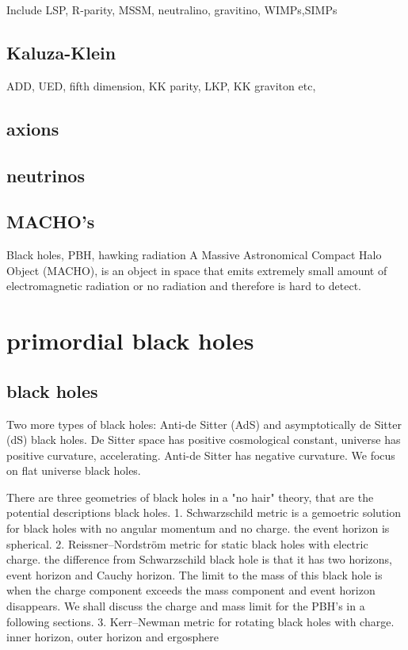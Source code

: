 \documentclass{article}
\begin{document}
Include LSP, R-parity, MSSM, neutralino, gravitino, WIMPs,SIMPs 

\subsection{Kaluza-Klein}
ADD, UED, fifth dimension, KK parity, LKP, KK graviton etc, 

\subsection {axions}

\subsection {neutrinos}

\subsection{MACHO's}
Black holes, PBH, hawking radiation 
A Massive Astronomical Compact Halo Object (MACHO), is an object in space that emits extremely small amount of electromagnetic radiation or no radiation and therefore is hard to detect. 
\section{primordial black holes}
\subsection {black holes}
Two more types of black holes: Anti-de Sitter (AdS) and asymptotically de Sitter (dS) black holes.
De Sitter space has positive cosmological constant, universe has positive curvature, accelerating. 
Anti-de Sitter has negative curvature. We focus on flat universe black holes. 

There are three geometries of black holes in a "no hair" theory, that are the potential descriptions black holes. 
1. Schwarzschild metric is a gemoetric solution for black holes with no angular momentum and no charge. the event horizon is spherical. 
2. Reissner–Nordström metric for static black holes with electric charge. the difference from Schwarzschild black hole is that it has two horizons, event horizon and Cauchy horizon. The limit to the mass of this black hole is when the charge component exceeds the mass component and event horizon disappears. We shall discuss the charge and mass limit for the PBH's in a following sections. 
3. Kerr–Newman metric for rotating black holes with charge. inner horizon, outer horizon and ergosphere 
\end{document}
